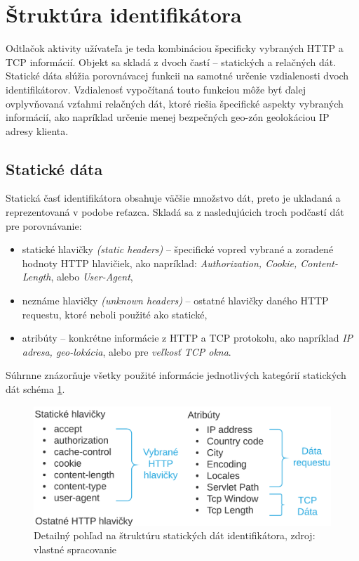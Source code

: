 \documentclass[
  printed, %
  table,   %
  lof,     %
  nolot,   %
  nocover
]{fithesis3}
\begin{document}
\section{Štruktúra identifikátora}
\label{s:footprint-structure}
Odtlačok aktivity užívateľa je teda kombináciou špecificky vybraných HTTP a TCP informácií.
Objekt sa skladá z dvoch častí -- statických a relačných dát. Statické
dáta slúžia porovnávacej funkcii na samotné
určenie vzdialenosti dvoch identifikátorov. Vzdialenosť vypočítaná touto
funkciou môže byť ďalej ovplyvňovaná vzťahmi relačných dát, ktoré riešia
špecifické aspekty vybraných informácií, ako napríklad určenie menej bezpečných
geo-zón geolokáciou IP adresy klienta.

\subsection{Statické dáta}
Statická časť identifikátora obsahuje väčšie množstvo dát, preto je
ukladaná a reprezentovaná v podobe reťazca. Skladá sa z nasledujúcich troch podčastí dát pre porovnávanie:
\begin{itemize}
    \item statické hlavičky \textit{(static headers)} -- špecifické vopred
    vybrané a zoradené hodnoty HTTP hlavičiek, ako napríklad: \textit{Authorization, Cookie, Content-Length}, alebo
    \textit{User-Agent},
    \item neznáme hlavičky \textit{(unknown headers)} -- ostatné hlavičky daného
    HTTP requestu, ktoré neboli použité ako statické,
    \item atribúty -- konkrétne informácie z HTTP a TCP protokolu, ako napríklad
    \textit{IP adresa, geo-lokácia}, alebo pre \textit{veľkosť TCP okna}.
\end{itemize}

Súhrnne znázorňuje všetky použité informácie jednotlivých kategórií statických dát schéma
\ref{fig:footprint-data-static}.

\begin{figure}[t]
  \centering
    \includegraphics[width=.95\textwidth]{images/footprint-data-static.png}
  \caption{Detailný pohľad na štruktúru statických dát identifikátora, zdroj:
  vlastné spracovanie}
  \label{fig:footprint-data-static}
\end{figure}
\end{document}
